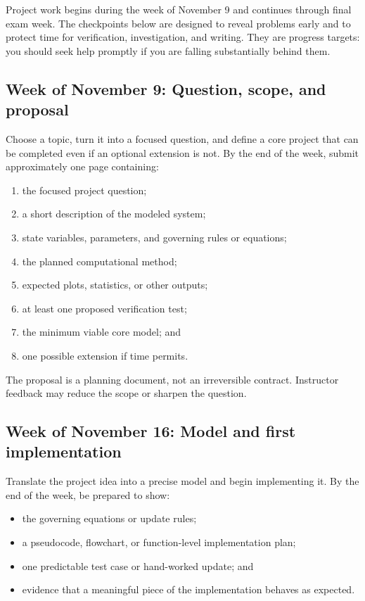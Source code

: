 \documentclass[11pt]{article}
\begin{document}
Project work begins during the week of November 9 and continues through final
exam week. The checkpoints below are designed to reveal problems early and to
protect time for verification, investigation, and writing. They are progress
targets: you should seek help promptly if you are falling substantially behind
them.

\subsection*{Week of November 9: Question, scope, and proposal}

Choose a topic, turn it into a focused question, and define a core project that
can be completed even if an optional extension is not. By the end of the week,
submit approximately one page containing:

\begin{enumerate}
  \item the focused project question;
  \item a short description of the modeled system;
  \item state variables, parameters, and governing rules or equations;
  \item the planned computational method;
  \item expected plots, statistics, or other outputs;
  \item at least one proposed verification test;
  \item the minimum viable core model; and
  \item one possible extension if time permits.
\end{enumerate}

The proposal is a planning document, not an irreversible contract. Instructor
feedback may reduce the scope or sharpen the question.

\subsection*{Week of November 16: Model and first implementation}

Translate the project idea into a precise model and begin implementing it. By
the end of the week, be prepared to show:

\begin{itemize}
  \item the governing equations or update rules;
  \item a pseudocode, flowchart, or function-level implementation plan;
  \item one predictable test case or hand-worked update; and
  \item evidence that a meaningful piece of the implementation behaves as
        expected.
\end{itemize}
\end{document}
